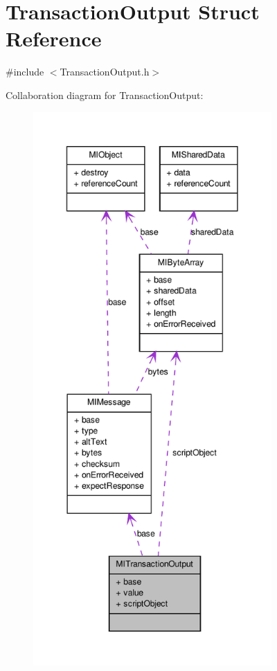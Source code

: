 \hypertarget{struct_m_i_transaction_output}{
\section{TransactionOutput Struct Reference}
\label{struct_m_i_transaction_output}
}


{\ttfamily \#include $<$TransactionOutput.h$>$}



Collaboration diagram for TransactionOutput:
\nopagebreak
\begin{figure}[H]
\begin{center}
\leavevmode
\includegraphics[height=600pt]{struct_m_i_transaction_output__coll__graph}
\end{center}
\end{figure}
